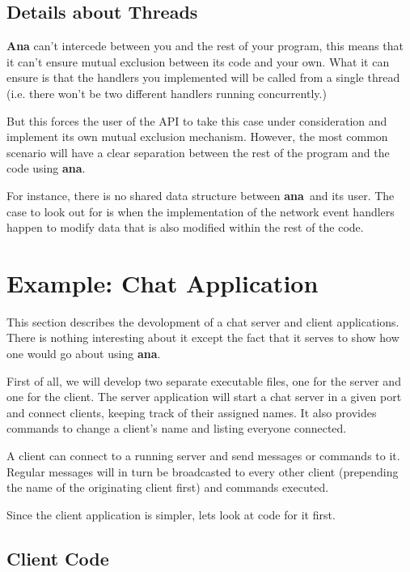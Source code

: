 \documentclass[a4paper,12pt,english]{article}
\newcommand{\ana}{\textbf{ana}}
\begin{document}
\subsection{Details about Threads}

\textbf{Ana} can't intercede between you and the rest of your program,
this means that it can't  ensure mutual exclusion between its code and
your own. What it can ensure is that the handlers you implemented will
be  called from a  single thread  (i.e. there  won't be  two different
handlers running concurrently.)

But  this  forces  the  user  of  the API  to  take  this  case  under
consideration    and    implement    its    own    mutual    exclusion
mechanism.  However,  the  most  common  scenario will  have  a  clear
separation between the rest of the program and the code using \ana.

For instance, there is no shared data structure between \ana \ and its
user.  The case  to look  out for  is when  the implementation  of the
network event  handlers happen  to modify data  that is  also modified
within the rest of the code.

\section{Example: Chat Application}

This  section describes  the  devolopment  of a chat server and client
applications. There is  nothing  interesting  about it except the fact
that it serves to show how one would go about using \ana.

First of all, we will  develop  two  separate executable files, one for
the server and one for the client. The server application  will start a 
chat server in a given  port  and  connect clients, keeping track of their
assigned  names. It also provides commands to change a client's name and
listing everyone connected.

A client can connect to a running server and send  messages or commands
to it. Regular messages will in  turn  be  broadcasted  to  every other
client (prepending the name of the originating client first) and commands
executed.

Since the client application is simpler, lets look at code for it first.

\subsection{Client Code}
\end{document}
